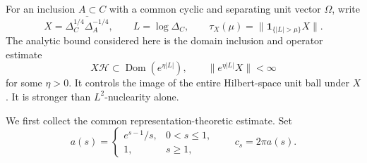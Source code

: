 \documentclass[a4paper,11pt]{article}
\theoremstyle{definition}
\begin{document}
For an inclusion $A\subset C$ with a common cyclic and separating unit vector
$\Omega$, write
\begin{equation}
 X=\overline{\Delta_C^{1/4}\Delta_A^{-1/4}},\qquad
 L=\log\Delta_C,\qquad
 \tau_X(\mu)=\|\mathbf1_{\{|L|>\mu\}}X\|.
 \label{eq:massive-conventions}
\end{equation}
The analytic bound considered here is the domain inclusion and operator estimate
\begin{equation}
 X\mathcal H\subset\operatorname{Dom}(e^{\eta|L|}),\qquad
 \|e^{\eta|L|}X\|<\infty
 \label{eq:massive-analytic-condition}
\end{equation}
for some $\eta>0$. It controls the image of the entire Hilbert-space unit ball
under $X$. It is stronger than $L^2$-nuclearity alone.

We first collect the common representation-theoretic estimate. Set
\begin{equation}
 a(s)=\begin{cases}e^{s-1}/s,&0<s\le1,\\1,&s\ge1,\end{cases}
 \qquad c_s=2\pi a(s).
 \label{eq:massive-constants}
\end{equation}
\end{document}
